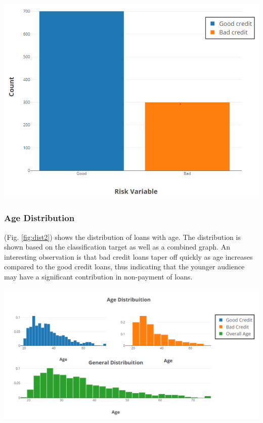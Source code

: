 \documentclass[a4paper, 12pt]{article}
\begin{document}
\begin{center}
\includegraphics[scale=0.6]{dist-1.png}
\label{fig:dist1}
\end{center}

\subsubsection{Age Distribution}
\noindent (Fig. \ref{fig:dist2}) shows the distribution of loans with age. The distribution is shown based on the classification target as well as a combined graph. An interesting observation is that bad credit loans taper off quickly as age increases compared to the good credit loans, thus indicating that the younger audience may have a significant contribution in non-payment of loans.

\begin{center}
\includegraphics[scale=0.4]{dist-2.png}
\label{fig:dist2}
\end{center}
\end{document}
